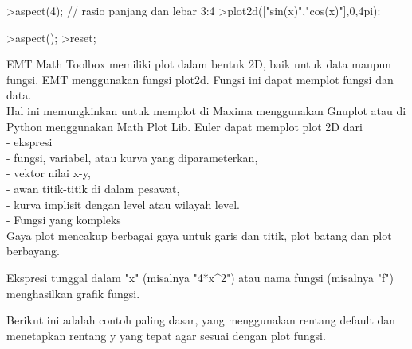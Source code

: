 \documentclass[12pt,Times new roman,letterpaper]{book}
\begin{document}
\begin{eulernootebook}
\begin{eulercomment}
\begin{eulercomment}
\begin{eulernootebook}
\begin{eulercomment}
\begin{eulercomment}
\begin{eulercomment}
\begin{eulercomment}
\begin{eulercomment}
\begin{eulercomment}
\begin{eulercomment}
\begin{eulernotebook}
\begin{eulercomment}
\end{eulercomment}
\begin{eulerprompt}
>aspect(4); // rasio panjang dan lebar 3:4
>plot2d(["sin(x)","cos(x)"],0,4pi):
\end{eulerprompt}
\begin{eulerprompt}
>aspect();
>reset;
\end{eulerprompt}
\begin{eulercomment}
EMT Math Toolbox memiliki plot dalam bentuk 2D, baik untuk data maupun
fungsi. EMT menggunakan fungsi plot2d. Fungsi ini dapat memplot fungsi
dan data.\\
Hal ini memungkinkan untuk memplot di Maxima menggunakan Gnuplot atau
di Python menggunakan Math Plot Lib. Euler dapat memplot plot 2D dari\\
-   ekspresi\\
-   fungsi, variabel, atau kurva yang diparameterkan,\\
-   vektor nilai x-y,\\
-   awan titik-titik di dalam pesawat,\\
-   kurva implisit dengan level atau wilayah level.\\
-   Fungsi yang kompleks\\
Gaya plot mencakup berbagai gaya untuk garis dan titik, plot batang
dan plot berbayang.


\begin{eulercomment}
\begin{eulercomment}
Ekspresi tunggal dalam "x" (misalnya "4*x\textasciicircum{}2") atau nama fungsi
(misalnya "f") menghasilkan grafik fungsi.

Berikut ini adalah contoh paling dasar, yang menggunakan rentang
default dan menetapkan rentang y yang tepat agar sesuai dengan plot
fungsi.


\end{eulercomment}
\end{eulercomment}
\end{eulercomment}
\end{eulernotebook}
\end{eulercomment}
\end{eulercomment}
\end{eulercomment}
\end{eulercomment}
\end{eulercomment}
\end{eulercomment}
\end{eulercomment}
\end{eulernootebook}
\end{eulercomment}
\end{eulercomment}
\end{eulernootebook}
\end{document}

